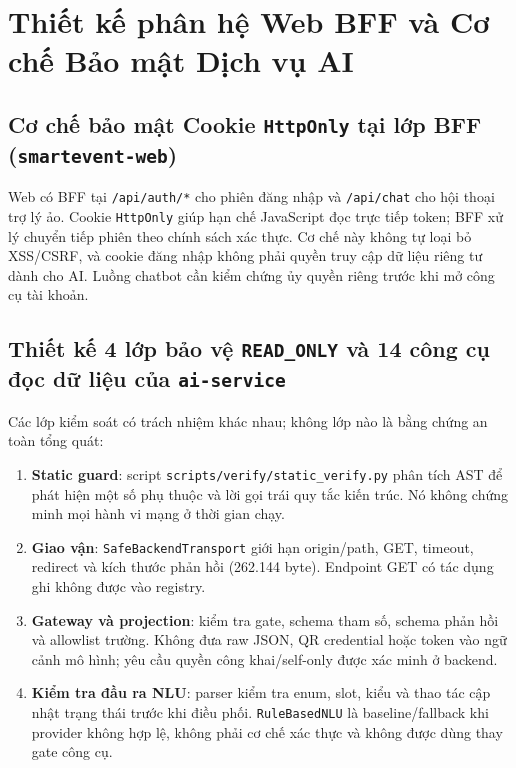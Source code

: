 \section{Thiết kế phân hệ Web BFF và Cơ chế Bảo mật Dịch vụ AI}
\label{sec:ai_service_design}

\subsection{Cơ chế bảo mật Cookie \texttt{HttpOnly} tại lớp BFF (\texttt{smartevent-web})}

Web có BFF tại \nolinkurl{/api/auth/*} cho phiên đăng nhập và \nolinkurl{/api/chat} cho hội thoại trợ lý ảo. Cookie \texttt{HttpOnly} giúp hạn chế JavaScript đọc trực tiếp token; BFF xử lý chuyển tiếp phiên theo chính sách xác thực. Cơ chế này không tự loại bỏ XSS/CSRF, và cookie đăng nhập không phải quyền truy cập dữ liệu riêng tư dành cho AI. Luồng chatbot cần kiểm chứng ủy quyền riêng trước khi mở công cụ tài khoản.

\subsection{Thiết kế 4 lớp bảo vệ \texttt{READ\_ONLY} và 14 công cụ đọc dữ liệu của \texttt{ai-service}}

Các lớp kiểm soát có trách nhiệm khác nhau; không lớp nào là bằng chứng an toàn tổng quát:
\begin{enumerate}[nosep]
  \item \textbf{Static guard}: script \nolinkurl{scripts/verify/static_verify.py} phân tích AST để phát hiện một số phụ thuộc và lời gọi trái quy tắc kiến trúc. Nó không chứng minh mọi hành vi mạng ở thời gian chạy.
  \item \textbf{Giao vận}: \texttt{SafeBackendTransport} giới hạn origin/path, GET, timeout, redirect và kích thước phản hồi (262.144 byte). Endpoint GET có tác dụng ghi không được vào registry.
  \item \textbf{Gateway và projection}: kiểm tra gate, schema tham số, schema phản hồi và allowlist trường. Không đưa raw JSON, QR credential hoặc token vào ngữ cảnh mô hình; yêu cầu quyền công khai/self-only được xác minh ở backend.
  \item \textbf{Kiểm tra đầu ra NLU}: parser kiểm tra enum, slot, kiểu và thao tác cập nhật trạng thái trước khi điều phối. \texttt{RuleBasedNLU} là baseline/fallback khi provider không hợp lệ, không phải cơ chế xác thực và không được dùng thay gate công cụ.
\end{enumerate}

